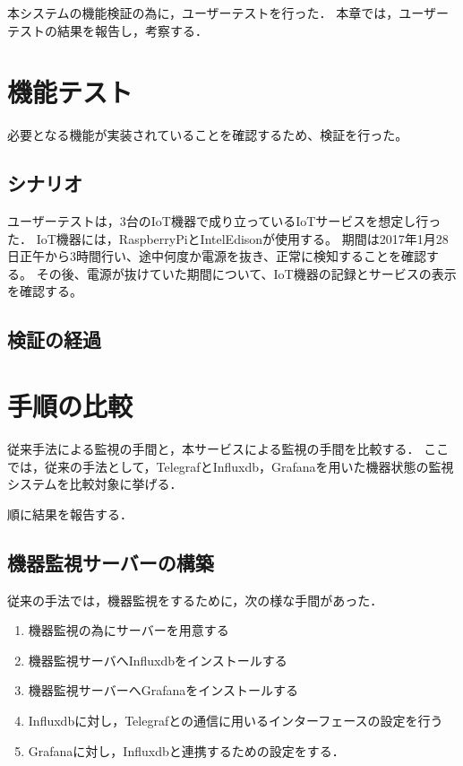 本システムの機能検証の為に，ユーザーテストを行った．
本章では，ユーザーテストの結果を報告し，考察する．

\section{機能テスト}
必要となる機能が実装されていることを確認するため、検証を行った。

\subsection{シナリオ}
ユーザーテストは，3台のIoT機器で成り立っているIoTサービスを想定し行った．
IoT機器には，RaspberryPiとIntelEdisonが使用する。
期間は2017年1月28日正午から3時間行い、途中何度か電源を抜き、正常に検知することを確認する。
その後、電源が抜けていた期間について、IoT機器の記録とサービスの表示を確認する。

\subsection{検証の経過}

\subsection{}


\section{手順の比較}
従来手法による監視の手間と，本サービスによる監視の手間を比較する．
ここでは，従来の手法として，TelegrafとInfluxdb，Grafanaを用いた機器状態の監視システムを比較対象に挙げる．

順に結果を報告する．
\subsection{機器監視サーバーの構築}
従来の手法では，機器監視をするために，次の様な手間があった．
\begin{enumerate}
\item 機器監視の為にサーバーを用意する
\item 機器監視サーバへInfluxdbをインストールする
\item 機器監視サーバーへGrafanaをインストールする
\item Influxdbに対し，Telegrafとの通信に用いるインターフェースの設定を行う
\item Grafanaに対し，Influxdbと連携するための設定をする．
\end{enumerate}

